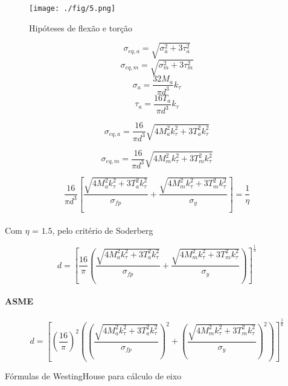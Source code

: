 \documentclass[a4paper, 12pt]{article}
\begin{document}
\begin{figure}[h]
\begin{center}
\texttt{[image: ./fig/5.png]}
\caption{\label{fig:6}Hipóteses de flexão e torção} 
\end{center}
\end{figure}

\[\sigma _{eq,a} = \sqrt{\sigma _{a}^{2}+3\tau _{a}^{2}}\]
\[\sigma _{eq,m} = \sqrt{\sigma _{m}^{2}+3\tau _{m}^{2}}\]
\[\sigma _{a}=\frac{32M_{a}}{\pi d^{3}}k_{\tau}\]
\[\tau _{a}=\frac{16T_{a}}{\pi d^{3}}k_{\tau}\]

\[\sigma _{eq,a}=\frac{16}{\pi d^{3}}\sqrt{4M_{a}^{2}k_{\tau}^{2}+3T_{a}^{2}k_{\tau}^{2}}\]

\[\sigma _{eq,m}=\frac{16}{\pi d^{3}}\sqrt{4M_{m}^{2}k_{\tau}^{2}+3T_{m}^{2}k_{\tau}^{2}}\]

\[\frac{16}{\pi d^{3}}\left[\frac{ \sqrt{4M_{a}^{2}k_{\tau}^{2}+3T_{a}^{2}k_{\tau}^{2}}}{\sigma _{fp}}  +  \frac{\sqrt{4M_{m}^{2}k_{\tau}^{2}+3T_{m}^{2}k_{\tau}^{2}}}{\sigma _{y}} \right] = \frac{1}{\eta}\]
\\

Com $\eta$ = $1.5$, pelo critério de Soderberg

\[d = \left[\frac{16}{\pi }\left(\frac{ \sqrt{4M_{a}^{2}k_{\tau}^{2}+3T_{a}^{2}k_{\tau}^{2}}}{\sigma _{fp}}  +  \frac{\sqrt{4M_{m}^{2}k_{\tau}^{2}+3T_{m}^{2}k_{\tau}^{2}}}{\sigma _{y}} \right)\right]^{\frac{1}{3}}\]

\paragraph*{ASME}
\[d = \left[\left( \frac{16}{\pi } \right)^{2} \left(  \left( \frac{ \sqrt{4M_{a}^{2}k_{\tau}^{2}+3T_{a}^{2}k_{\tau}^{2}}}{\sigma _{fp}} \right)^{2}  +  \left( \frac{\sqrt{4M_{m}^{2}k_{\tau}^{2}+3T_{m}^{2}k_{\tau}^{2}}}{\sigma _{y}} \right)^{2}  \right)\right]^{\frac{1}{6}}\]

Fórmulas de WestingHouse para cálculo de eixo
\end{document}
